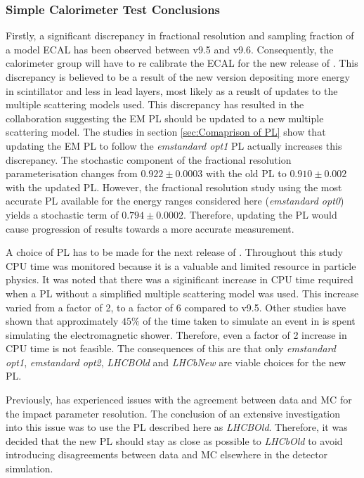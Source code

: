 \subsubsection{Simple Calorimeter Test Conclusions}
\label{ref:CaloConclusions}
Firstly, a significant discrepancy in fractional resolution and sampling fraction of a model \lhcb ECAL has been observed between \geant v9.5 and v9.6.  Consequently, the \lhcb calorimeter group will have to re calibrate the ECAL for the new release of \gauss. This discrepancy is believed to be a result of the new \geant version depositing more energy in scintillator and less in lead layers, most likely as a reuslt of updates to the multiple scattering models used.  This discrepancy has resulted in the \geant collaboration suggesting the \lhcb EM PL should be updated to a new multiple scattering model.  The studies in section \ref{sec:Comaprison of PL} show that updating the \lhcb EM PL to follow the \textit{emstandard opt1} PL actually increases this discrepancy. The stochastic component of the fractional resolution parameterisation changes from $0.922 \pm 0.0003$ with the old \lhcb PL to $0.910\pm 0.002$ with the updated \lhcb PL. However, the fractional resolution study using the most accurate PL available for the energy ranges considered here (\textit{emstandard opt0}) yields a stochastic term of $0.794\pm0.0002$.  Therefore, updating the \lhcb PL would cause progression of results towards a more accurate measurement.

A choice of PL has to be made for the next release of \gauss.  Throughout this study CPU time was monitored because it is a valuable and limited resource in particle physics.  It was noted that there was a siginificant increase in CPU time required when a PL without a simplified multiple scattering model was used. This increase varied from a factor of 2, to a factor of 6 compared to v9.5.  Other studies have shown that approximately $45\%$ of the time taken to simulate an event in \gauss is spent simulating the electromagnetic shower.  Therefore, even a factor of 2 increase in CPU time is not feasible.  The consequences of this are that only \textit{emstandard opt1}, \textit{emstandard opt2}, \textit{LHCBOld} and \textit{LHCbNew} are viable choices for the new PL.

Previously, \lhcb has experienced issues with the agreement between data and MC for the impact parameter resolution.  The conclusion of an extensive investigation into this issue was to use the PL described here as \textit{LHCBOld}.  Therefore, it was decided that the new PL should stay as close as possible to \textit{LHCbOld} to avoid introducing disagreements between data and MC elsewhere in the detector simulation.

